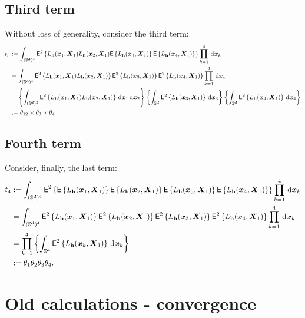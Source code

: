 \documentclass{article}
\begin{document}
\subsection{Third term}

Without loss of generality, consider the third term:
\begin{align*}
    t_3 &\defin \int_{(\Sr)^4} \mathsf{E}^2 \lrb{ L_{\bh} (\bx_1,\bX_1) L_{\bh} (\bx_2,\bX_1) \mathsf{E} \lrb{ L_{\bh} (\bx_3,\bX_1)} \mathsf{E} \lrb{ L_{\bh} (\bx_4,\bX_1)} }\prod_{k=1}^{4} \,\rd \bx_k \\
    &= \int_{(\Sr)^4} \mathsf{E}^2 \lrb{ L_{\bh} (\bx_1,\bX_1) L_{\bh} (\bx_2,\bX_1) } \mathsf{E}^2 \lrb{ L_{\bh} (\bx_3,\bX_1)} \mathsf{E}^2 \lrb{ L_{\bh} (\bx_4,\bX_1)} \prod_{k=1}^{4} \,\rd \bx_k \\
    &= \lrb{\int_{(\Sr)^2} \mathsf{E}^2 \lrb{ L_{\bh} (\bx_1,\bX_1) L_{\bh} (\bx_2,\bX_1) } \,\rd \bx_1 \,\rd \bx_2} \lrb{\int_{\Sr} \mathsf{E}^2 \lrb{ L_{\bh} (\bx_3,\bX_1)} \,\rd \bx_3} \lrb{\int_{\Sr} \mathsf{E}^2 \lrb{ L_{\bh} (\bx_4,\bX_1)} \,\rd \bx_4} \\
    &\defin \theta_{12} \times \theta_3 \times \theta_4
\end{align*}

\subsection{Fourth term}

Consider, finally, the last term:
\begin{align*}
    t_4 &\defin \int_{(\Sr)^4} \mathsf{E}^2 \lrb{ \mathsf{E} \lrb{ L_{\bh} (\bx_1,\bX_1)} \mathsf{E} \lrb{ L_{\bh} (\bx_2,\bX_1)} \mathsf{E} \lrb{ L_{\bh} (\bx_3,\bX_1)} \mathsf{E} \lrb{ L_{\bh} (\bx_4,\bX_1)} }\prod_{k=1}^{4} \,\rd \bx_k \\
    &= \int_{(\Sr)^4} \mathsf{E}^2 \lrb{ L_{\bh} (\bx_1,\bX_1) } \mathsf{E}^2 \lrb{L_{\bh} (\bx_2,\bX_1) } \mathsf{E}^2 \lrb{ L_{\bh} (\bx_3,\bX_1)} \mathsf{E}^2 \lrb{ L_{\bh} (\bx_4,\bX_1)} \prod_{k=1}^{4} \,\rd \bx_k \\
    &= \prod_{k=1}^{4} \lrb{\int_{\Sr}  \mathsf{E}^2 \lrb{ L_{\bh} (\bx_k,\bX_1)} \,\rd \bx_k} \\
    & \defin \theta_1 \theta_2 \theta_3 \theta_4.
\end{align*}

\section{Old calculations - convergence}
\end{document}
